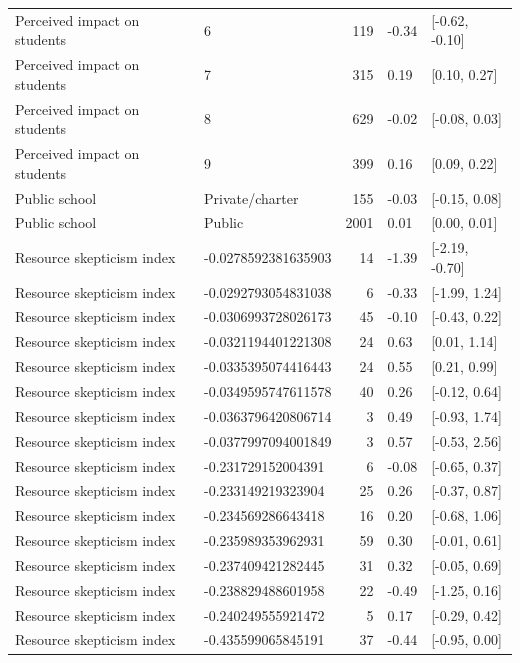 \begin{tabular}{llrll}
Perceived impact on students & 6 & 119 & -0.34 & {}[-0.62, -0.10]\\
\addlinespace
Perceived impact on students & 7 & 315 & 0.19 & {}[0.10, 0.27]\\
Perceived impact on students & 8 & 629 & -0.02 & {}[-0.08, 0.03]\\
Perceived impact on students & 9 & 399 & 0.16 & {}[0.09, 0.22]\\
Public school & Private/charter & 155 & -0.03 & {}[-0.15, 0.08]\\
Public school & Public & 2001 & 0.01 & {}[0.00, 0.01]\\
\addlinespace
Resource skepticism index & -0.0278592381635903 & 14 & -1.39 & {}[-2.19, -0.70]\\
Resource skepticism index & -0.0292793054831038 & 6 & -0.33 & {}[-1.99, 1.24]\\
Resource skepticism index & -0.0306993728026173 & 45 & -0.10 & {}[-0.43, 0.22]\\
Resource skepticism index & -0.0321194401221308 & 24 & 0.63 & {}[0.01, 1.14]\\
Resource skepticism index & -0.0335395074416443 & 24 & 0.55 & {}[0.21, 0.99]\\
\addlinespace
Resource skepticism index & -0.0349595747611578 & 40 & 0.26 & {}[-0.12, 0.64]\\
Resource skepticism index & -0.0363796420806714 & 3 & 0.49 & {}[-0.93, 1.74]\\
Resource skepticism index & -0.0377997094001849 & 3 & 0.57 & {}[-0.53, 2.56]\\
Resource skepticism index & -0.231729152004391 & 6 & -0.08 & {}[-0.65, 0.37]\\
Resource skepticism index & -0.233149219323904 & 25 & 0.26 & {}[-0.37, 0.87]\\
\addlinespace
Resource skepticism index & -0.234569286643418 & 16 & 0.20 & {}[-0.68, 1.06]\\
Resource skepticism index & -0.235989353962931 & 59 & 0.30 & {}[-0.01, 0.61]\\
Resource skepticism index & -0.237409421282445 & 31 & 0.32 & {}[-0.05, 0.69]\\
Resource skepticism index & -0.238829488601958 & 22 & -0.49 & {}[-1.25, 0.16]\\
Resource skepticism index & -0.240249555921472 & 5 & 0.17 & {}[-0.29, 0.42]\\
\addlinespace
Resource skepticism index & -0.435599065845191 & 37 & -0.44 & {}[-0.95, 0.00]\\

\end{tabular}

